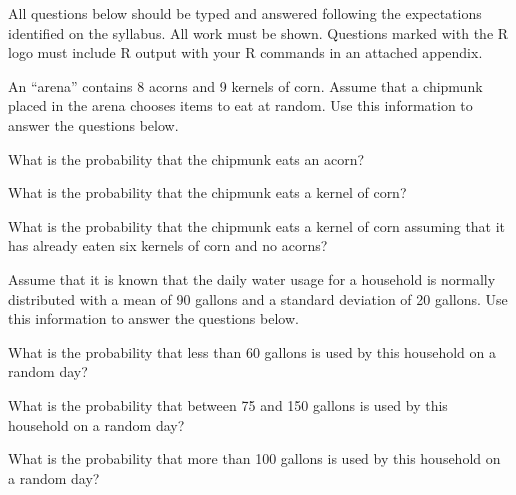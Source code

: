 \documentclass[10pt,openany]{book}\usepackage[]{graphicx}\usepackage[]{color}
\begin{document}
\begin{hwsection}{All questions below should be typed and answered following the expectations identified on the syllabus.  All work must be shown.  Questions marked with the R logo must include R output with your R commands in an attached appendix.}

  \item \label{hwprob:ProbChipmunk} An ``arena'' contains 8 acorns and 9 kernels of corn.  Assume that a chipmunk placed in the arena chooses items to eat at random.  Use this information to answer the questions below.
  \begin{Enumerate}
    \item What is the probability that the chipmunk eats an acorn?
    \item What is the probability that the chipmunk eats a kernel of corn?
    \item What is the probability that the chipmunk eats a kernel of corn assuming that it has already eaten six kernels of corn and no acorns?
  \end{Enumerate}

  \item \label{hwprob:ProbWater} \rhw{} Assume that it is known that the daily water usage for a household is normally distributed with a mean of 90 gallons and a standard deviation of 20 gallons.  Use this information to answer the questions below.
  \begin{Enumerate}
    \item What is the probability that less than 60 gallons is used by this household on a random day?
    \item What is the probability that between 75 and 150 gallons is used by this household on a random day?
    \item What is the probability that more than 100 gallons is used by this household on a random day?
  \end{Enumerate}
\end{hwsection}
\end{document}
